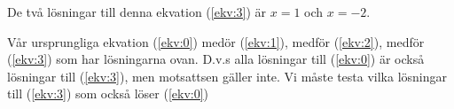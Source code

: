 \documentclass{article}
\begin{document}
De två lösningar till denna ekvation (\ref{ekv:3}) är $x = 1$ och $x = - 2$.

Vår ursprungliga ekvation (\ref{ekv:0}) medör (\ref{ekv:1}), medför (\ref{ekv:2}), medför (\ref{ekv:3}) som har lösningarna ovan.
D.v.s alla lösningar till (\ref{ekv:0}) är också lösningar till (\ref{ekv:3}), men motsattsen gäller inte. Vi måste testa vilka lösningar till (\ref{ekv:3}) som också löser (\ref{ekv:0})
\end{document}

